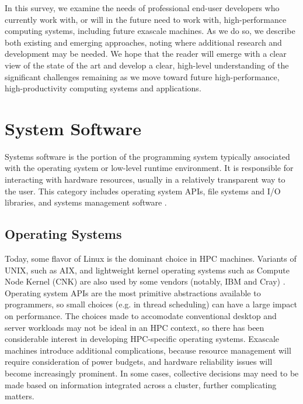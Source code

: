 \documentclass[12pt]{article}
\begin{document}
In this survey, we examine the needs of professional end-user developers who currently work with, or will in the future need to work with, high-performance computing systems, including future exascale machines. As we do so, we describe both existing and emerging approaches, noting where additional research and development may be needed. We hope that the reader will emerge with a clear view of the state of the art and develop a clear, high-level understanding of the significant challenges remaining as we move toward future high-performance, high-productivity  computing systems and applications.


\section{System Software}
Systems software is the portion of the programming system typically associated with the operating system or low-level runtime environment. It is responsible for interacting with hardware resources, usually in a relatively transparent way to the user. This category includes operating system APIs, file systems and I/O libraries, and systems management software \cite{exascale-roadmap}.

\subsection{Operating Systems} 
Today, some flavor of Linux is the dominant choice in HPC machines. Variants of UNIX, such as AIX, and lightweight kernel operating systems such as Compute Node Kernel (CNK) are also used by some vendors (notably, IBM and Cray) \cite{hpc-survey}. Operating system APIs are the most primitive abstractions available to programmers, so small choices (e.g. in thread scheduling) can have a large impact on performance. The choices made to accomodate conventional desktop and server workloads may not be ideal in an HPC context, so there has been considerable interest in developing HPC-specific operating systems. Exascale machines introduce additional complications, because resource management will require consideration of power budgets, and hardware reliability issues will become increasingly prominent. In some cases, collective decisions may need to be made based on information integrated across a cluster, further complicating matters. 
\end{document}
